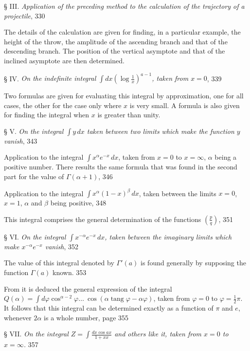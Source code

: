 \documentclass{article}
\begin{document}
§ III. \emph{Application of the preceding method to the calculation of the trajectory of a projectile}, 330

The details of the calculation are given for finding, in a particular example, the height of the throw, the amplitude of the ascending branch and that of the descending branch. The position of the vertical asymptote and that of the inclined asymptote are then determined.

§ IV. \emph{On the indefinite integral $\displaystyle\int dx\left(\log\frac{1}{x}\right)^{a-1}$, taken from $x=0$}, 339

Two formulas are given for evaluating this integral by approximation, one for all cases, the other for the case only where $x$ is very small. A formula is also given for finding the integral when $x$ is greater than unity.

§ V. \emph{On the integral $\displaystyle\int y\,dx$ taken between two limits which make the function $y$ vanish}, 343

Application to the integral $\displaystyle\int x^{\alpha}e^{-x}\,dx$, taken from $x=0$ to $x=\infty$, $\alpha$ being a positive number. There results the same formula that was found in the second part for the value of $\Gamma(\alpha+1)$, 346

Application to the integral $\displaystyle\int x^{\alpha}(1-x)^{\beta}\,dx$, taken between the limits $x=0$, $x=1$, $\alpha$ and $\beta$ being positive, 348

This integral comprises the general determination of the functions $\left(\frac{p}{q}\right)$, 351

§ VI. \emph{On the integral $\displaystyle\int x^{-\alpha}e^{-x}\,dx$, taken between the imaginary limits which make $x^{-\alpha}e^{-x}$ vanish}, 352

The value of this integral denoted by $\Gamma'(a)$ is found generally by supposing the function $\Gamma(a)$ known. 353

From it is deduced the general expression of the integral $Q(\alpha)=\displaystyle\int d\varphi\cos^{\alpha-2}\varphi\ldots\ \cos(\alpha\operatorname{tang}\varphi-\alpha\varphi)$, taken from $\varphi=0$ to $\varphi=\frac{1}{2}\pi$. It follows that this integral can be determined exactly as a function of $\pi$ and $e$, whenever $2\alpha$ is a whole number, page 355

§ VII. \emph{On the integral $Z=\displaystyle\int\frac{dx\cos ax}{1+xx}$ and others like it, taken from $x=0$ to $x=\infty$.} 357
\end{document}
